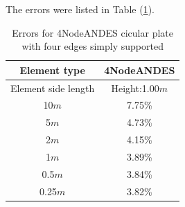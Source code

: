 \documentclass[fleqn,11pt,letter]{article}
\begin{document}
The errors were listed in Table (\ref{table Errors for 4NodeANDES cicular plate with four edges simply supported}).

\begin{table}[H]
  \centering
  \caption{Errors for 4NodeANDES cicular plate with four edges simply supported}
  \label{table Errors for 4NodeANDES cicular plate with four edges simply supported}
\begin{tabular}{|c|c|}
\hline
Element type     & 4NodeANDES          \\ \hline
Element side length & Height:1.00$m$   \\ \hline
10$m$            & 7.75\%        \\ \hline
5$m$             & 4.73\%        \\ \hline
2$m$             & 4.15\%        \\ \hline
1$m$             & 3.89\%        \\ \hline
0.5$m$           & 3.84\%        \\ \hline
0.25$m$          & 3.82\%       \\
\hline
\end{tabular}
\end{table}
\end{document}
